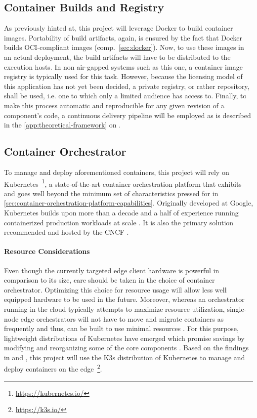 \subsection{Container Builds and Registry}
\label{sec:deployment-container-builds-and-registry}

As previously hinted at, this project will leverage Docker to build container images. Portability of build artifacts, again, is ensured by the fact that Docker builds \acs{OCI}-compliant images (comp.~\autoref{sec:docker}). Now, to use these images in an actual deployment, the build artifacts will have to be distributed to the execution hosts. In non air-gapped systems such as this one, a container image registry is typically used for this task. However, because the licensing model of this application has not yet been decided, a private registry, or rather repository, shall be used, i.e. one to which only a limited audience has access to. Finally, to make this process automatic and reproducible for any given revision of a component's code, a continuous delivery pipeline will be employed as is described in the \autoref{app:theoretical-framework} on .


\subsection{Container Orchestrator}
\label{sec:deployment-container-orchestrator}

To manage and deploy aforementioned containers, this project will rely on Kubernetes~\footnote{\url{https://kubernetes.io/}}, a state-of-the-art container orchestration platform that exhibits and goes well beyond the minimum set of characteristics pressed for in \autoref{sec:container-orchestration-platform-capabilities}. Originally developed at Google, Kubernetes builds upon more than a decade and a half of experience running containerized production workloads at scale \cite[p.~50]{burns2016borg}. It is also the primary solution recommended and hosted by the \ac{CNCF} \cite[p.~13]{pahl2017cloud}.


\paragraph{Resource Considerations}

Even though the currently targeted edge client hardware is powerful in comparison to its size, care should be taken in the choice of container orchestrator. Optimizing this choice for resource usage will allow less well equipped hardware to be used in the future. Moreover, whereas an orchestrator running in the cloud typically attempts to maximize resource utilization, single-node edge orchestrators will not have to move and migrate containers as frequently and thus, can be built to use minimal resources \cite[p.~2]{goethals2019fledge}. For this purpose, lightweight distributions of Kubernetes have emerged which promise savings by modifying and reorganizing some of the core components \cite[pp.~65--66]{bohm2021profiling}. Based on the findings in \cite{bohm2021profiling} and \cite{goethals2019fledge}, this project will use the K3s distribution of Kubernetes to manage and deploy containers on the edge~\footnote{\url{https://k3s.io/}}.


